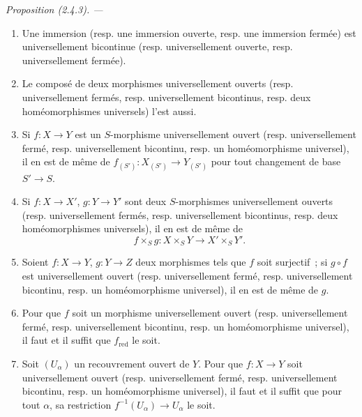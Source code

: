 \documentclass[10pt,oneside]{book}
\makeatletter
\newenvironment{proposition}[1][]{%
  \par\medskip\noindent\itshape Proposition (#1). ---\ }{\par}
\newcommand{\EGAReaderTarget}[2]{\hypertarget{#1}{}\@bsphack\begingroup\def\@currentHref{#1}\label{#2}\endgroup\@esphack}
\makeatother
\begin{document}
\begin{proposition}[2.4.3]
\EGAReaderTarget{ega4.c04.prop.2-4-3}{IV.2.4.3-fr}
\begin{enumerate}
\item[(i)] Une immersion (resp. une immersion ouverte, resp. une immersion
fermée) est universellement bicontinue (resp. universellement ouverte, resp.
universellement fermée).
\item[(ii)] Le composé de deux morphismes universellement ouverts (resp.
universellement fermés, resp. universellement bicontinus, resp. deux
homéomorphismes universels) l'est aussi.
\item[(iii)] Si $f:X\to Y$ est un $S$-morphisme universellement ouvert (resp.
universellement fermé, resp. universellement bicontinu, resp. un
homéomorphisme universel), il en est de même de
$f_{(S')}:X_{(S')}\to Y_{(S')}$ pour tout changement de base $S'\to S$.
\item[(iv)] Si $f:X\to X'$, $g:Y\to Y'$ sont deux $S$-morphismes
universellement ouverts (resp. universellement fermés, resp. universellement
bicontinus, resp. deux homéomorphismes universels), il en est de même de
\[
f\times_S g:X\times_S Y\longrightarrow X'\times_S Y'.
\]
\item[(v)] Soient $f:X\to Y$, $g:Y\to Z$ deux morphismes tels que $f$ soit
surjectif~; si $g\circ f$ est universellement ouvert (resp. universellement
fermé, resp. universellement bicontinu, resp. un homéomorphisme universel), il
en est de même de $g$.
\item[(vi)] Pour que $f$ soit un morphisme universellement ouvert (resp.
universellement fermé, resp. universellement bicontinu, resp. un
homéomorphisme universel), il faut et il suffit que $f_{\mathrm{red}}$ le soit.
\item[(vii)] Soit $(U_\alpha)$ un recouvrement ouvert de $Y$. Pour que
$f:X\to Y$ soit universellement ouvert (resp. universellement fermé, resp.
universellement bicontinu, resp. un homéomorphisme universel), il faut et il
suffit que pour tout $\alpha$, sa restriction
$f^{-1}(U_\alpha)\to U_\alpha$ le soit.
\end{enumerate}
\end{proposition}
\end{document}
